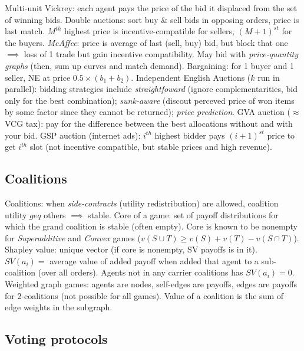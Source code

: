 \documentclass[10pt,a4paper,landscape]{article}
\newcommand{\concept}[1]{\textcolor{Emerald}{#1}} %
\newcommand{\subconcept}[1]{\textit{#1}}
\begin{document}
\begin{multicols*}{4}
\concept{Multi-unit Vickrey}: each agent pays the price of the bid it displaced from the set of winning bids.
\concept{Double auctions}: sort buy \& sell bids in opposing orders, price is last match. $M^{th}$ highest price is incentive-compatible for sellers, $(M+1)^{st}$ for the buyers. \subconcept{McAffee}: price is average of last (sell, buy) bid, but block that one $\implies$ loss of 1 trade but gain incentive compatibility. May bid with \subconcept{price-quantity graphs} (then, sum up curves and match demand).
\concept{Bargaining}: for 1 buyer and 1 seller, NE at price $0.5 \times (b_1 + b_2)$.
\concept{Independent English Auctions} ($k$ run in parallel): bidding strategies include \subconcept{straightfoward} (ignore complementarities, bid only for the best combination); \subconcept{sunk-aware} (discout perceved price of won items by some factor since they cannot be returned); \subconcept{price prediction}.
\concept{GVA auction} ($\approx$ VCG tax): pay for the difference between the best allocations without and with your bid.
\concept{GSP auction} (internet ads): $i^{th}$ highest bidder pays $(i+1)^{st}$ price to get $i^{th}$ slot (not incentive compatible, but stable prices and high revenue).

\subsection{Coalitions}

\concept{Coalitions}: when \subconcept{side-contracts} (utility redistribution) are allowed, coalition utility $geq$ others $\implies$ stable.
\concept{Core} of a game: set of payoff distributions for which the grand coalition is stable (often empty).
Core is known to be nonempty for \subconcept{Superadditive} and \subconcept{Convex} games ($v(S \cup T) \geq v(S) + v(T) - v(S \cap T)$).
\concept{Shapley value}: unique vector (if core is nonempty, SV payoffs is in it). $SV(a_i) = $ average value of added payoff when added that agent to a sub-coalition (over all orders). Agents not in any carrier coalitions has $SV(a_i) = 0$.
\concept{Weighted graph games}: agents are nodes, self-edges are payoffs, edges are payoffs for 2-coalitions (not possible for all games). Value of a coalition is the sum of edge weights in the subgraph.

\subsection{Voting protocols}


\end{multicols*}
\end{document}
